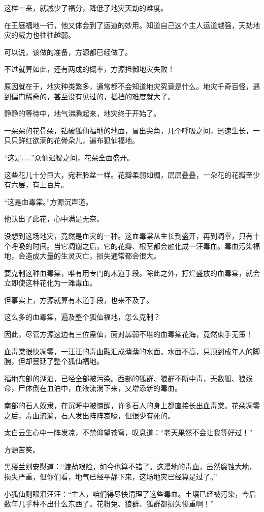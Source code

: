 \begin{this_body}
这样一来，就减少了福分，降低了地灾天劫的难度。

在王庭福地一行，他又体会到了运道的妙用。知道自己这个主人运道越强，天劫地灾的威力也往往越弱。

可以说，该做的准备，方源都已经做了。

不过就算如此，还有两成的概率，方源抵御地灾失败！

原因就在于，地灾种类繁多，通常都不会知道地灾究竟是什么。地灾千奇百怪，遇到偏门稀奇的，甚至没有见过的，抵挡的难度就大了。

静静的等待中，地气沸腾起来，地灾终于开始了。

一朵朵的花骨朵，钻破狐仙福地的地面，冒出尖角，几个呼吸之间，迅速生长，一只只鲜红欲滴的花骨朵儿，遍布狐仙福地。

“这是……”众仙迟疑之间，花朵全面盛开。

这些花儿十分巨大，宛若脸盆一样。花瓣柔弱如绸，层层叠叠，一朵花的花瓣至少有六层，有上百片。

“这是血毒棠。”方源沉声道。

他认出了此花，心中满是无奈。

没想到这场地灾，竟然是血灾的一种。这血毒棠从生长到盛开，再到凋零，只有十个呼吸的时间。当它凋谢之后，它的花瓣、根茎都会融化成一汪毒血。毒血污染福地，会造成大量的生灵灭亡，损失通常都会很大。

要克制这种血毒棠，唯有用专门的木道手段。除此之外，打烂盛放的血毒棠，就会立即使这种花化为一滩毒血。

但事实上，方源就算有木道手段，也来不及了。

这么多的血毒棠，遍及整个狐仙福地，怎么克制？

因此，尽管方源这边有三位蛊仙，面对孱弱不堪的血毒棠花海，竟然束手无策！

血毒棠很快凋零，一汪汪的毒血融汇成薄薄的水面。水面不高，只顶到成年人的脚腕，但却蔓延了整个狐仙福地。

福地东部的湖泊，已经全部被污染。西部的狐群、狼群不断中毒，无数狐、狼殒命，尸体倒在血泊中，血液流淌下来，又增添新的毒血。

南部的石人奴隶，在沉睡中被惊醒，许多石人的身上都直接长出血毒棠。花朵凋零之后，毒血流淌，石人发出阵阵哀嚎，但很少有死的。

太白云生心中一阵发凉，不禁仰望苍穹，叹息道：“老天果然不会让我等好过！”

方源苦笑。

黑楼兰则安慰道：“渡劫艰险，如今也算不错了。这漫地的毒血，虽然腐蚀大地，损失严重，但你们看，地气已经平静下来，这场地灾已经算是过了。”

小狐仙则眼泪汪汪：“主人，咱们得尽快清理了这些毒血。土壤已经被污染，今后数年几乎种不出什么东西了。花粉兔、狼群、狐群都损失惨重啊！”


\end{this_body}
